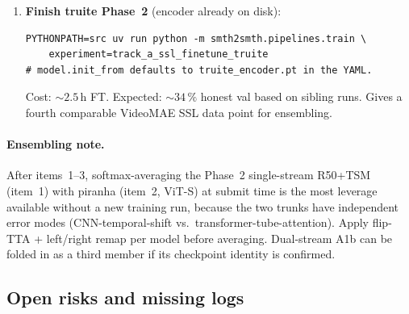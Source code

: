 \begin{enumerate}[leftmargin=*]
\begin{lstlisting}[style=shell]
# Then submit with tta_scales=[1.0], tta_flip=true.
\end{lstlisting}
   Cost: \(\sim 3\,\)h.  Re-grounds rouget at 34.96\,\% honest;
   archive the existing leaky  first.
\item \textbf{Finish truite Phase~2} (encoder already on disk):
\begin{lstlisting}[style=shell]
PYTHONPATH=src uv run python -m smth2smth.pipelines.train \
    experiment=track_a_ssl_finetune_truite
# model.init_from defaults to truite_encoder.pt in the YAML.
\end{lstlisting}
   Cost: \(\sim 2.5\,\)h FT.  Expected: \(\sim 34\,\%\) honest val based
   on sibling runs.  Gives a fourth comparable VideoMAE SSL data point
   for ensembling.
\end{enumerate}

\paragraph{Ensembling note.}  After items~1--3, softmax-averaging the
Phase~2 single-stream R50+TSM (item~1) with piranha (item~2, ViT-S) at
submit time is the most leverage available without a new training run,
because the two trunks have independent error modes (CNN-temporal-shift
vs.\ transformer-tube-attention).  Apply flip-TTA + left/right remap
per model before averaging.  Dual-stream A1b can be folded in as a
third member if its checkpoint identity is confirmed.

\subsection{Open risks and missing logs}
\label{sec:tracka:inventory:risks}

